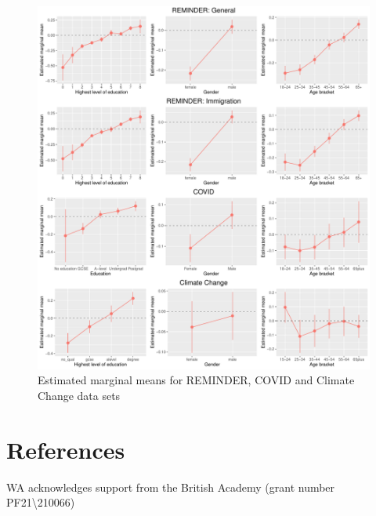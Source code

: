 \documentclass[12pt,halfline,a4paper,]{ouparticle}
\begin{document}
\begin{figure}[!h]
\includegraphics[width=1\linewidth]{Revisiting-the-Measurement-and-Dimensionality-of-Political-Knowledge--Evidence-from-Seven-European-Countries_files/figure-latex/emmeans_plots2-1} \caption{Estimated marginal means for REMINDER, COVID and Climate Change data sets}\label{fig:emmeans_plots2}
\end{figure}

\hypertarget{references}{%
\section{References}\label{references}}


\begin{notes}[Acknowledgements]
WA acknowledges support from the British Academy (grant number
PF21\textbackslash210066)
\end{notes}
\end{document}
